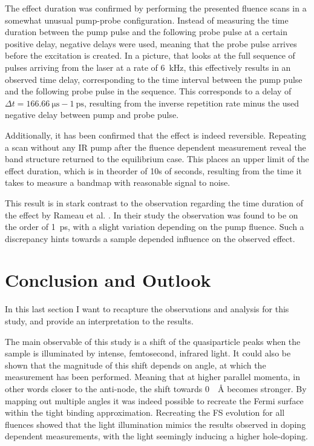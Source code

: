The effect duration was confirmed by performing the presented fluence scans in a somewhat unusual pump-probe configuration.
Instead of measuring the time duration between the pump pulse and the following probe pulse at a certain positive delay, negative delays were used, meaning that the probe pulse arrives before the excitation is created.
In a picture, that looks at the full sequence of pulses arriving from the laser at a rate of \qty{6}{\kilo\hertz}, this effectively results in an observed time delay, corresponding to the time interval between the pump pulse and the following probe pulse in the sequence.
This corresponds to a delay of $\Delta t = \qty{166.66}{\micro\second} - \qty{1}{\pico\second}$, resulting from the inverse repetition rate minus the used negative delay between pump and probe pulse.

Additionally, it has been confirmed that the effect is indeed reversible.
Repeating a scan without any IR pump after the fluence dependent measurement reveal the band structure returned to the equilibrium case.
This places an upper limit of the effect duration, which is in theorder of 10s of seconds, resulting from the time it takes to measure a bandmap with reasonable signal to noise.

This result is in stark contrast to the observation regarding the time duration of the effect by Rameau et al. \cite{rameau_photoinduced_2014}.
In their study the observation was found to be on the order of \qty{1}{\pico\second}, with a slight variation depending on the pump fluence.
Such a discrepancy hints towards a sample depended influence on the observed effect.

\section{Conclusion and Outlook}

In this last section I want to recapture the observations and analysis for this study, and provide an interpretation to the results.

The main observable of this study is a shift of the quasiparticle peaks when the sample is illuminated by intense, femtosecond, infrared light.
It could also be shown that the magnitude of this shift depends on angle, at which the measurement has been performed.
Meaning that at higher parallel momenta, in other words closer to the anti-node, the shift towards \qty{0}{\per\angstrom} becomes stronger.
By mapping out multiple angles it was indeed possible to recreate the Fermi surface within the tight binding approximation.
Recreating the FS evolution for all fluences showed that the light illumination mimics the results observed in doping dependent measurements, with the light seemingly inducing a higher hole-doping.

